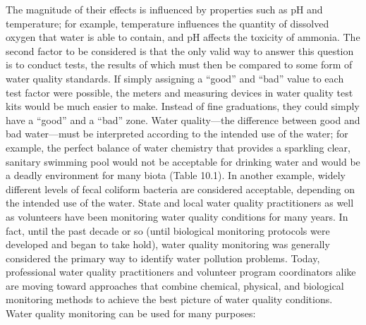 \documentclass{article}
\begin{document}
The magnitude of their effects is influenced by properties such as pH
and temperature; for example, temperature influences the quantity of
dissolved oxygen that water is able to contain, and pH affects the
toxicity of ammonia. The second factor to be considered is that the only
valid way to answer this question is to conduct tests, the results of
which must then be compared to some form of water quality standards. If
simply assigning a ``good'' and ``bad'' value to each test factor were
possible, the meters and measuring devices in water quality test kits
would be much easier to make. Instead of fine graduations, they could
simply have a ``good'' and a ``bad'' zone. Water quality---the
difference between good and bad water---must be interpreted according to
the intended use of the water; for example, the perfect balance of water
chemistry that provides a sparkling clear, sanitary swimming pool would
not be acceptable for drinking water and would be a deadly environment
for many biota (Table 10.1). In another example, widely different levels
of fecal coliform bacteria are considered acceptable, depending on the
intended use of the water. State and local water quality practitioners
as well as volunteers have been monitoring water quality conditions for
many years. In fact, until the past decade or so (until biological
monitoring protocols were developed and began to take hold), water
quality monitoring was generally considered the primary way to identify
water pollution problems. Today, professional water quality
practitioners and volunteer program coordinators alike are moving toward
approaches that combine chemical, physical, and biological monitoring
methods to achieve the best picture of water quality conditions. Water
quality monitoring can be used for many purposes:
\end{document}
